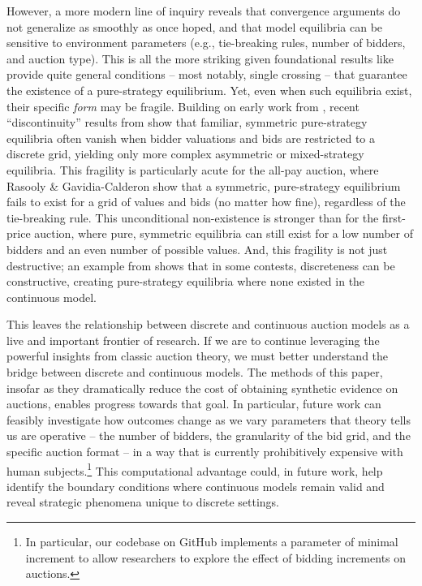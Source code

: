 \documentclass{article} %
\newcommand{\kibitz}[2]{\ifnum\Comments=1{\color{#1}{#2}}\fi}
\newcommand{\dcp}[1]{\kibitz{teal}{[DCP: #1]}}
\begin{document}
However, a more modern line of inquiry reveals that convergence arguments do not generalize as smoothly as once hoped, and that model equilibria can be sensitive to environment parameters (e.g., tie-breaking rules, number of bidders, and auction type). This is all the more striking given foundational results like \cite{athey2001single} provide quite general conditions -- most notably, single crossing -- that guarantee the existence of a pure-strategy equilibrium. Yet, even when such equilibria exist, their specific \textit{form} may be fragile. Building on early work from \cite{maskin1985revenue}, recent ``discontinuity'' results from \cite{rasooly2020importance} show that familiar, symmetric pure-strategy equilibria often vanish when bidder valuations and bids are restricted to a discrete grid, yielding only more complex asymmetric or mixed-strategy equilibria. This fragility is particularly acute for the all-pay auction, where Rasooly \& Gavidia-Calderon show that a symmetric, pure-strategy equilibrium fails to exist for a grid of values and bids (no matter how fine), regardless of the tie-breaking rule. This unconditional non-existence is stronger than for the first-price auction, where pure, symmetric equilibria can still exist for a low number of bidders and an even number of possible values. And, this fragility is not just destructive; an example from \cite{boudreau2011all} shows that in some contests, discreteness can be constructive, creating pure-strategy equilibria where none existed in the continuous model.

This leaves the relationship between discrete and continuous auction models as a live and important frontier of research. If we are to continue leveraging the powerful insights from classic auction theory, we must better understand the bridge between discrete and continuous models. The methods of this paper, insofar as they dramatically reduce the cost of obtaining synthetic evidence on auctions, enables progress towards that goal. In particular, future work can feasibly investigate how outcomes change as we vary parameters that theory tells us are operative -- the number of bidders, the granularity of the bid grid, and the specific auction format -- in a way that is currently prohibitively expensive with human subjects.\footnote{In particular, our codebase on GitHub implements a parameter of minimal increment to allow researchers to explore the effect of bidding increments on auctions.} This computational advantage could, in future work, help identify the boundary conditions where continuous models remain valid and reveal strategic phenomena unique to discrete settings.
\end{document}
